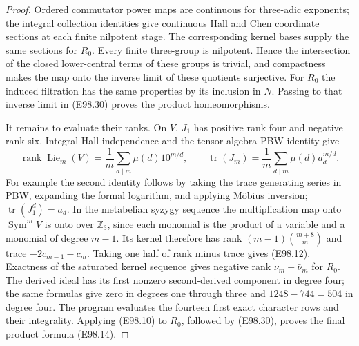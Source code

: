 \begin{proof}
Ordered commutator power maps are continuous
for three-adic exponents; the integral
collection identities give continuous Hall
and Chen coordinate sections at each finite
nilpotent stage. The corresponding kernel
bases supply the same sections for $R_0$.
Every finite three-group is nilpotent.
Hence the intersection of the closed
lower-central terms of these groups is
trivial, and compactness makes the map
onto the inverse limit of these quotients
surjective. For $R_0$ the induced filtration
has the same properties by its inclusion
in $N$. Passing to that inverse limit in
(E98.30) proves the product homeomorphisms.

It remains to evaluate their ranks. On $V$,
$J_1$ has positive rank four and negative
rank six. Integral Hall independence and
the tensor-algebra PBW identity give
\[
 \operatorname{rank}\operatorname{Lie}_m(V)
     =\frac1m\sum_{d\mid m}\mu(d)10^{m/d},\qquad
 \operatorname{tr}(J_m)
     =\frac1m\sum_{d\mid m}\mu(d)a_d^{m/d}.
 \tag{E98.31}
\]
For example the second identity follows by
taking the trace generating series in PBW,
expanding the formal logarithm, and applying
M\"obius inversion; $\operatorname{tr}(J_1^d)=a_d$.
In the metabelian syzygy sequence the
multiplication map onto $\operatorname{Sym}^mV$
is onto over $\mathbb Z_3$, since each
monomial is the product of a variable and
a monomial of degree $m-1$. Its kernel
therefore has rank $(m-1)\binom{m+8}{m}$
and trace $-2c_{m-1}-c_m$.
Taking one half of rank minus trace gives
(E98.12). Exactness of the saturated
kernel sequence gives negative rank
$\nu_m-\bar\nu_m$ for $R_0$.
The derived ideal has its first nonzero
second-derived component in degree four;
the same formulas give zero in degrees
one through three and $1248-744=504$
in degree four. The program evaluates
the fourteen first exact character rows
and their integrality. Applying (E98.10)
to $R_0$, followed by (E98.30), proves
the final product formula (E98.14).
\end{proof}
